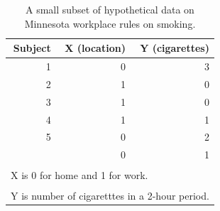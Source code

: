 \documentclass[
]{krantz}
\begin{document}
\begin{table}
\centering
\caption{\label{tab:ex3chp4}A small subset of hypothetical data on Minnesota workplace rules on smoking.}
\centering
\begin{tabular}[t]{rrr}
\toprule
Subject & X (location) & Y (cigarettes)\\
\midrule
1 & 0 & 3\\
2 & 1 & 0\\
3 & 1 & 0\\
4 & 1 & 1\\
5 & 0 & 2\\
\addlinespace
6 & 0 & 1\\
\bottomrule
\multicolumn{3}{l}{\textsuperscript{} X is 0 for home and 1 for work.}\\
\multicolumn{3}{l}{\textsuperscript{} Y is number of cigaretttes in a 2-hour period.}\\
\end{tabular}
\end{table}
\end{document}
